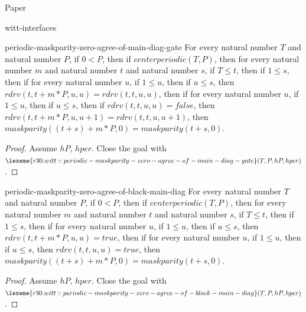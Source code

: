 \begin{lexlean}{Paper}
\begin{section}{witt-interfaces}
  \begin{theorem}{periodic-maskparity-zero-agree-of-main-diag-gate}
  For every natural number \(T\) and natural number \(P\), if \(0 < P\), then if \(centerperiodic(T, P)\), then for every natural number \(m\) and natural number \(t\) and natural number \(s\), if \(T ≤ t\), then if \(1 ≤ s\), then if for every natural number \(u\), if \(1 ≤ u\), then if \(u ≤ s\), then \(rdrv(t, t + m * P, u, u) = rdrv(t, t, u, u)\), then if for every natural number \(u\), if \(1 ≤ u\), then if \(u ≤ s\), then if \(rdrv(t, t, u, u) = false\), then \(rdrv(t, t + m * P, u, u + 1) = rdrv(t, t, u, u + 1)\), then \(maskparity((t + s) + m * P, 0) = maskparity(t + s, 0)\).
  \begin{proof}
  Assume \(hP\), \(hper\).
  Close the goal with \(\lexeme{r30.witt::periodic-maskparity-zero-agree-of-main-diag-gate}(T, P, hP, hper)\).
  \end{proof}
  \end{theorem}

  \begin{theorem}{periodic-maskparity-zero-agree-of-black-main-diag}
  For every natural number \(T\) and natural number \(P\), if \(0 < P\), then if \(centerperiodic(T, P)\), then for every natural number \(m\) and natural number \(t\) and natural number \(s\), if \(T ≤ t\), then if \(1 ≤ s\), then if for every natural number \(u\), if \(1 ≤ u\), then if \(u ≤ s\), then \(rdrv(t, t + m * P, u, u) = true\), then if for every natural number \(u\), if \(1 ≤ u\), then if \(u ≤ s\), then \(rdrv(t, t, u, u) = true\), then \(maskparity((t + s) + m * P, 0) = maskparity(t + s, 0)\).
  \begin{proof}
  Assume \(hP\), \(hper\).
  Close the goal with \(\lexeme{r30.witt::periodic-maskparity-zero-agree-of-black-main-diag}(T, P, hP, hper)\).
  \end{proof}
  \end{theorem}


\end{section}
\end{lexlean}

